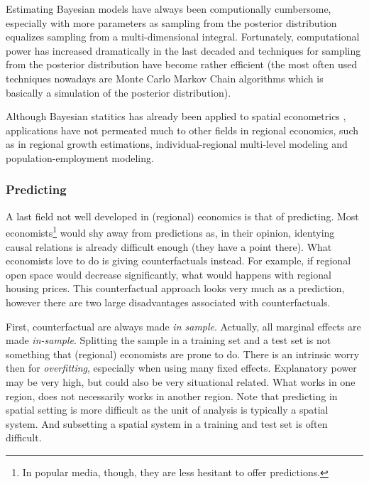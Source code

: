 \documentclass[fleqn,10pt]{SelfArx} %
\begin{document}
Estimating Bayesian models have always been computionally cumbersome, especially
with more parameters as sampling from the posterior distribution equalizes
sampling from a multi-dimensional integral. Fortunately, computational power has
increased dramatically in the last decaded and techniques for sampling from the
posterior distribution have become rather efficient (the most often used
techniques nowadays are Monte Carlo Markov Chain algorithms which is basically a
simulation of the posterior distribution).

Although Bayesian statitics has already been applied to spatial
econometrics \citep[see the excellent textbook
of][]{lesage2009introduction}, applications have not permeated much to other fields
in regional economics, such as in regional growth estimations,
individual-regional multi-level modeling and population-employment modeling.  

\subsubsection{Predicting}

A last field not well developed in (regional) economics is that of predicting.
Most economists\footnote{In popular media, though, they are less hesitant to
  offer predictions.} would shy away from predictions as, in their opinion, identying
causal relations is already difficult enough (they have a point there). What
economists love to do is giving counterfactuals instead. For example, if
regional open space would decrease significantly, what would happens with
regional housing prices. This counterfactual approach looks very much as a
prediction, however there are two large disadvantages associated with
counterfactuals.

First, counterfactual are always made \emph{in sample}. Actually, all marginal
effects are made \emph{in-sample}. Splitting the sample in a training set and a
test set is not something that (regional) economists are prone to do. There is
an intrinsic worry then for \emph{overfitting}, especially when using many fixed
effects. Explanatory power may be very high, but could also be very situational
related. What works in one region, does not necessarily works in another region.
Note that predicting in spatial setting is more difficult as the unit of
analysis is typically a spatial system. And subsetting a spatial system in a
training and test set is often difficult.
\end{document}
